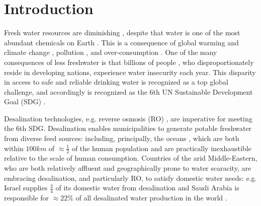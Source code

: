 \documentclass[journal=ACSES&TWater,manuscript=article]{achemso}
\begin{document}
\section{Introduction}
Fresh water resources are diminishing \cite{Laghari2013MeltingUncertainty,Rasul2008GlobalRanges}, despite that water is one of the most abundant chemicals on Earth \cite{Shiklomanov1993WorldResources}. This is a consequence of global warming \cite{Hansen2006GlobalChange,IPCC2018Global1.5C} and climate change \cite{Thomas2004ExtinctionChange}, pollution \cite{Pappas2017EnergySuperpower,Zhao2016DecouplingInvestment,Moller2010DistributionWatershed}, and over-consumption \cite{Bongaarts2009HumanTransition,Meyer1992HumanChange}. One of the many consequences of less freshwater is that billions of people \cite{Unicef2017ThirstingClimate}, who disproportionately reside in developing nations, experience water insecurity each year. This disparity in access to safe and reliable drinking water is recognized as a top global challenge, and accordingly is recognized as the 6th UN Sustainable Development Goal (SDG) \cite{Jones2018TheOutlook}. 

Desalination technologies, e.g. reverse osmosis (RO) \cite{Malaeb2011ReverseReview}, are imperative for meeting the 6th SDG. Desalination enables municipalities to generate potable freshwater from diverse feed sources: including, principally, the oceans \cite{2018DepartmentWater,Service2006DesalinationUp}, which are both within $100 km$ of $\approx \frac{1}{2}$ of the human population \cite{Amy2017Membrane-basedProspects} and are practically inexhaustible relative to the scale of human consumption. Countries of the arid Middle-Eastern, who are both relatively affluent and geographically prone to water scaracity, are embracing desalination, and  particularly RO, to satisfy domestic water needs: e.g. Israel supplies $\frac{3}{4}$ of its domestic water from desalination \cite{Shemer2017SustainableImpact} and Saudi Arabia is responsible for $\approx 22\%$ of all desalinated water production in the world \cite{Council2021WaterPrivatization}.
\end{document}

